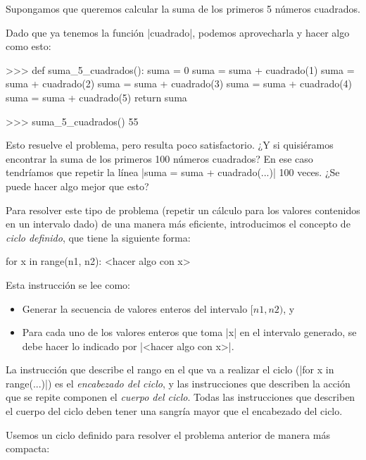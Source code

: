 \begin{problema}
Supongamos que queremos calcular la suma de los primeros 5 números cuadrados.

\begin{solucion}
Dado que ya tenemos la función |cuadrado|, podemos aprovecharla y hacer algo
como esto:

\begin{codigo-python-sn}
>>> def suma_5_cuadrados():
	suma = 0
	suma = suma + cuadrado(1)
	suma = suma + cuadrado(2)
	suma = suma + cuadrado(3)
	suma = suma + cuadrado(4)
	suma = suma + cuadrado(5)
	return suma

>>> suma_5_cuadrados()
55
\end{codigo-python-sn}
\end{solucion}

Esto resuelve el problema, pero resulta poco satisfactorio. ¿Y si quisiéramos
encontrar la suma de los primeros 100 números cuadrados? En ese caso tendríamos
que repetir la línea |suma = suma + cuadrado(...)| 100 veces. ¿Se puede hacer
algo mejor que esto?

Para resolver este tipo de problema (repetir un cálculo para los valores
contenidos en un intervalo dado) de una manera más eficiente, introducimos el
concepto de \emph{ciclo definido}, que tiene la siguiente forma:

\begin{codigo-python-sn}
for x in range(n1, n2):
    <hacer algo con x>
\end{codigo-python-sn}

Esta instrucción se lee como:

\begin{itemize}
\item Generar la secuencia de valores enteros del intervalo $[n1, n2)$, y
\item Para cada uno de los valores enteros que toma |x| en el intervalo generado,
se debe hacer lo indicado por |<hacer algo con x>|.
\end{itemize}

La instrucción que describe el rango en el que va a realizar el ciclo
(|for x in range(...)|) es el \emph{encabezado del ciclo}, y las instrucciones
que describen la acción que se repite componen el \emph{cuerpo del ciclo}.
Todas las instrucciones que describen el cuerpo del ciclo deben tener una
sangría mayor que el encabezado del ciclo.

\begin{solucion}
Usemos un ciclo definido para resolver el problema anterior de manera más
compacta:


\end{solucion}
\end{problema}
